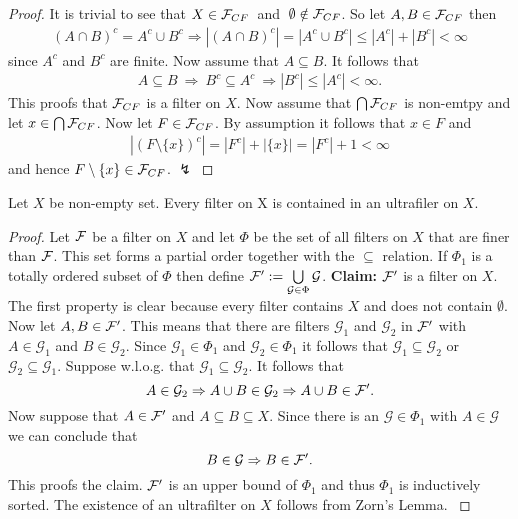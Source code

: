 \begin{proof}
  It is trivial to see that $X \in \mathcal{F}_{CF}\:$ and $\:\emptyset \notin \mathcal{F}_{CF}$. So let $A, B \in \mathcal{F}_{CF}$ then
  \begin{align*}
    (A \cap B)^c = A^c \cup B^c \Rightarrow \left| (A \cap B)^c \right| = \left | A^c \cup B^c \right| \leq \left| A^c \right| + \left| B^c \right| < \infty
  \end{align*}
  since $A^c$ and $B^c$ are finite.
  Now assume that $A \subseteq B$. It follows that
  \begin{align*}
    A \subseteq B \: \Rightarrow \: B^c \subseteq A^c \: \Rightarrow \left|B^c\right| \leq \left|A^c\right| < \infty.
  \end{align*}
  This proofs that $\mathcal{F}_{CF}$ is a filter on $X$.
  Now assume that $\bigcap \mathcal{F}_{CF}$ is non-emtpy and let $x \in \bigcap \mathcal{F}_{CF}$. Now let $F \in \mathcal{F}_{CF}$. By assumption it follows that $x \in F$ and
  \begin{align*}
    \left|(F\setminus \{x\})^c\right| = \left| F^c \right| + \left| \{x \} \right| = \left| F^c \right| + 1 < \infty
  \end{align*}
  and hence $F\setminus \{x\} \in \mathcal{F}_{CF}$. $\lightning$
\end{proof}

\begin{thm}\label{thm:ulfil}
  Let $X$ be non-empty set. Every filter on X is contained in an ultrafiler on $X$.
\end{thm}

\begin{proof}
  Let $\mathcal{F}$ be a filter on $X$ and let $\Phi$ be the set of all filters on $X$ that are finer than $\mathcal{F}$. This set forms a partial order together with the $\subseteq$ relation.
  If $\Phi_1$ is a totally ordered subset of $\Phi$ then define $\mathcal{F}' := \bigcup\limits_{\mathcal{G} \in \Phi} \mathcal{G}$.
  \textbf{Claim: } $\mathcal{F}'$ is a filter on $X$. The first property is clear because every filter contains $X$ and does not contain $\emptyset$.
  Now let $A, B \in \mathcal{F}'$. This means that there are filters $\mathcal{G}_1$ and $\mathcal{G}_2$ in $\mathcal{F}'$ with $A \in \mathcal{G}_1$ and $B \in \mathcal{G}_2$.
  Since $\mathcal{G}_1 \in \Phi_1$ and $\mathcal{G}_2 \in \Phi_1$ it follows that $\mathcal{G}_1 \subseteq \mathcal{G}_2$ or $\mathcal{G}_2 \subseteq \mathcal{G}_1$. Suppose w.l.o.g. that $\mathcal{G}_1 \subseteq \mathcal{G}_2$.
  It follows that
  \begin{equation*}
    A \in \mathcal{G}_2 \Rightarrow A \cup B \in \mathcal{G}_2 \Rightarrow A \cup B \in \mathcal{F}'.
  \end{equation*}
  Now suppose that $A \in \mathcal{F}'$ and $A \subseteq B \subseteq X$. Since there is an $\mathcal{G} \in \Phi_1$ with $A \in \mathcal{G}$ we can conclude that
  \begin{equation*}
    B \in \mathcal{G} \Rightarrow B \in \mathcal{F}'.
  \end{equation*}
  This proofs the claim. $\mathcal{F}'$ is an upper bound of $\Phi_1$ and thus $\Phi_1$ is inductively sorted. The existence of an ultrafilter on $X$ follows from Zorn's Lemma. \cite[5.12 Satz]{BvQMT}
\end{proof}

